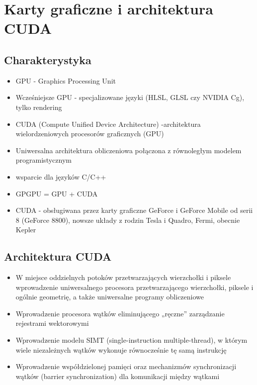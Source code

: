\documentclass[a4paper,twoside]{article}
\begin{document}
\section{Karty graficzne i architektura CUDA}
\subsection{Charakterystyka}
\begin{itemize}
	\item GPU - Graphics Processing Unit
	\item Wcześniejsze GPU - specjalizowane języki (HLSL, GLSL czy NVIDIA Cg), tylko rendering
	\item CUDA (Compute Unified Device Architecture) -architektura wielordzeniowych procesorów graficznych (GPU)
	\item Uniwersalna architektura obliczeniowa połączona z równoległym modelem programistycznym
	\item wsparcie dla języków C/C++
	\item GPGPU = GPU + CUDA
	\item CUDA - obsługiwana przez karty graficzne GeForce i GeForce Mobile od serii 8 (GeForce 8800), nowsze układy z rodzin Tesla i Quadro, Fermi, obecnie Kepler
\end{itemize}
\subsection{Architektura CUDA}
\begin{itemize}
	\item W miejsce oddzielnych potoków przetwarzających wierzchołki i piksele wprowadzenie uniwersalnego procesora przetwarzającego wierzchołki, piksele i ogólnie geometrię, a także uniwersalne programy obliczeniowe
	\item Wprowadzenie procesora wątków eliminującego „ręczne” zarządzanie rejestrami wektorowymi
	\item Wprowadzenie modelu SIMT (single-instruction multiple-thread), w którym wiele niezależnych wątków wykonuje równocześnie tę samą instrukcję
	\item Wprowadzenie współdzielonej pamięci oraz mechanizmów synchronizacji wątków (barrier synchronization) dla komunikacji między wątkami
\end{itemize}
\end{document}
